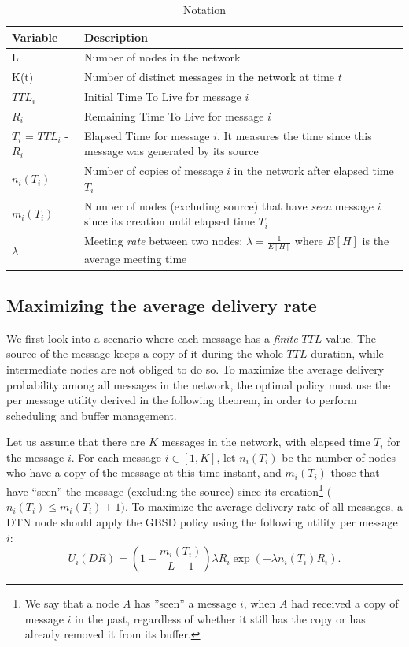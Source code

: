 \begin{table}
\caption{Notation}
\centering
\label{table:notation}
\footnotesize
\begin{tabular}{|p{1.8cm}|p{5.7cm}|}
\hline
\bfseries Variable & \bfseries Description\\
\hline
L & Number of nodes in the network\\
\hline
K(t) & Number of distinct messages in the network at time $t$\\
\hline
$TTL_i$ & Initial Time To Live for message $i$\\
\hline
$R_i$ & Remaining Time To Live for message $i$\\
\hline
$T_i$ = $TTL_i$ - $R_i$ & Elapsed Time for message $i$. It measures the time since this message was generated by its source\\
\hline
$n_i(T_i)$ & Number of copies of message $i$ in the network after elapsed time $T_i$\\
\hline $m_i(T_i)$ & Number of nodes (excluding source) that
have \emph{seen} message $i$ since its creation until elapsed time $T_i$\\
\hline
$\lambda$ & Meeting \emph{rate} between two nodes; $\lambda = \frac{1}{E[H]}$ where $E[H]$ is the average meeting time\\
\hline
\end{tabular}
\end{table}
\normalsize

\subsection{Maximizing the average delivery rate}
\label{subsec:MaxAvgDeliveryRate}
We first look into a scenario where each message has a \emph{finite} $TTL$ value. The source of the message keeps a copy of it during the whole $TTL$ duration, while intermediate nodes are not obliged to do so. To maximize the average delivery probability among all messages in the network, the optimal policy must use the per message utility derived in the following theorem, in order to perform scheduling and buffer management.

\begin{theorem}\label{th:delivery-rate}
Let us assume that there are $K$ messages in the network, with
elapsed time $T_{i}$ for the message $i$. For each message $i \in [1,K]$, let $n_i(T_i)$ be the number of nodes who have a copy of the message at this time instant, and $m_i(T_i)$ those that have ``seen'' the message (excluding the source) since its creation\footnote{We say that a node \emph{A} has ''seen'' a message $i$, when $A$ had received a copy of message $i$ in the past, regardless of whether it still has the copy or has already removed it from its buffer.} ($n_i(T_i) \leqslant m_i(T_i)+1)$. To maximize the average delivery rate of all messages, a DTN node should apply the GBSD policy using the following utility per message $i$:
\begin{equation}\label{eq:GBSD-delivery-rate}
U_{i}(DR) = (1-\frac{m_i(T_i)}{L-1})\lambda R_i\exp(-\lambda n_i(T_i) R_i).
\end{equation}
\end{theorem}


